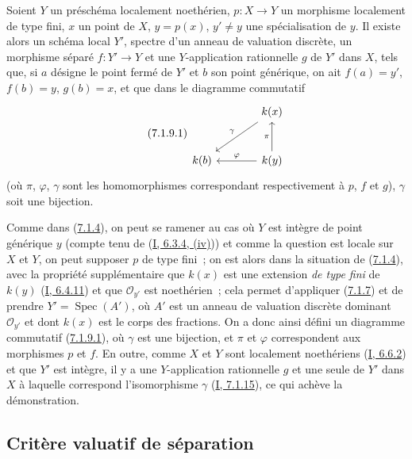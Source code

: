 \begin{proposition}[7.1.9]
\label{II.7.1.9-fr}
Soient $Y$ un préschéma localement noethérien, $p:X\to Y$ un morphisme
localement de type fini, $x$ un point de $X$, $y=p(x)$, $y'\neq y$ une
spécialisation de $y$. Il existe alors un schéma local $Y'$, spectre d'un
anneau de valuation discrète, un morphisme séparé $f:Y'\to Y$ et une
$Y$-application rationnelle $g$ de $Y'$ dans $X$, tels que, si $a$ désigne le
point fermé de $Y'$ et $b$ son point générique, on ait $f(a)=y'$,
$f(b)=y$, $g(b)=x$, et que dans le diagramme commutatif
\[
\tag{7.1.9.1}
\label{II.7.1.9.1-fr}
\begin{tikzcd}[column sep=large,row sep=large]
& k(x) \arrow[dl,"\gamma"'] \\
k(b) & k(y) \arrow[u,"\pi"] \arrow[l,"\varphi"']
\end{tikzcd}
\]
(où $\pi$, $\varphi$, $\gamma$ sont les homomorphismes correspondant
respectivement à $p$, $f$ et $g$), $\gamma$ soit une bijection.
\end{proposition}

Comme dans (\hyperref[II.7.1.4-fr]{7.1.4}), on peut se ramener au cas où $Y$
est intègre de point générique $y$ (compte tenu de
(\hyperref[I.6.3.4-fr]{I, 6.3.4, (iv)})) et comme la question est locale sur
$X$ et $Y$, on peut supposer $p$ de type fini~; on est alors dans la situation
de (\hyperref[II.7.1.4-fr]{7.1.4}), avec la propriété supplémentaire que
$k(x)$ est une extension \emph{de type fini} de $k(y)$
(\hyperref[I.6.4.11-fr]{I, 6.4.11}) et que $\mathcal{O}_{y'}$ est noethérien~;
cela permet d'appliquer (\hyperref[II.7.1.7-fr]{7.1.7}) et de prendre
$Y'=\operatorname{Spec}(A')$, où $A'$ est un anneau de valuation discrète
dominant $\mathcal{O}_{y'}$ et dont $k(x)$ est le corps des fractions. On a
donc ainsi défini un diagramme commutatif
(\hyperref[II.7.1.9.1-fr]{7.1.9.1}), où $\gamma$ est une bijection, et $\pi$
et $\varphi$ correspondent aux morphismes $p$ et $f$. En outre, comme $X$ et
$Y$ sont localement noethériens (\hyperref[I.6.6.2-fr]{I, 6.6.2}) et que $Y'$
est intègre, il y a une $Y$-application rationnelle $g$ et une seule de $Y'$
dans $X$ à laquelle correspond l'isomorphisme $\gamma$
(\hyperref[I.7.1.15-fr]{I, 7.1.15}), ce qui achève la démonstration.

\subsection{Critère valuatif de séparation}
\label{subsection:II.7.2-fr}

